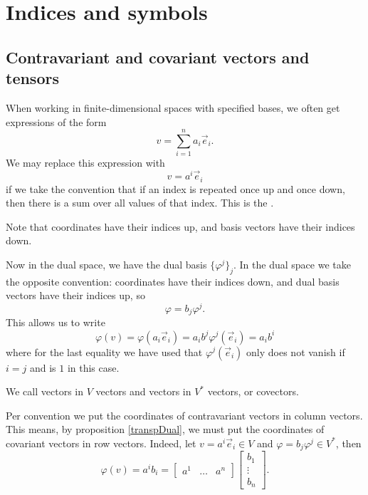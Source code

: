 















\chapter{Indices and symbols}
\section{Contravariant and covariant vectors and tensors}
When working in finite-dimensional spaces with specified bases, we often get expressions of the form
\[ v = \sum_{i=1}^n a_i \vec{e}_i. \]
We may replace this expression with
\[ v = a^i \vec{e}_i \]
if we take the convention that if an index is repeated once up and once down, then there is a sum over all values of that index. This is the .

Note that coordinates have their indices up, and basis vectors have their indices down.

Now in the dual space, we have the dual basis $\{\varphi^j\}_j$. In the dual space we take the opposite convention: coordinates have their indices down, and dual basis vectors have their indices up, so
\[ \varphi = b_j \varphi^j. \]
This allows us to write
\[ \varphi(v) = \varphi(a_i \vec{e}_i) = a_i b^j \varphi^j(\vec{e}_i) = a_i b^i \]
where for the last equality we have used that $\varphi^j(\vec{e}_i)$ only does not vanish if $i=j$ and is $1$ in this case.

We call vectors in $V$  vectors and vectors in $V^*$  vectors, or covectors.

Per convention we put the coordinates of contravariant vectors in column vectors. This means, by proposition \ref{transpDual}, we must put the coordinates of covariant vectors in row vectors. Indeed, let $v=a^i \vec{e}_i\in V$ and $\varphi = b_j\varphi^j \in V^*$, then
\[ \varphi(v) = a^ib_i = \begin{bmatrix}
a^1 & \hdots & a^n
\end{bmatrix}\begin{bmatrix}
b_1 \\ \vdots  \\ b_n
\end{bmatrix}. \]

